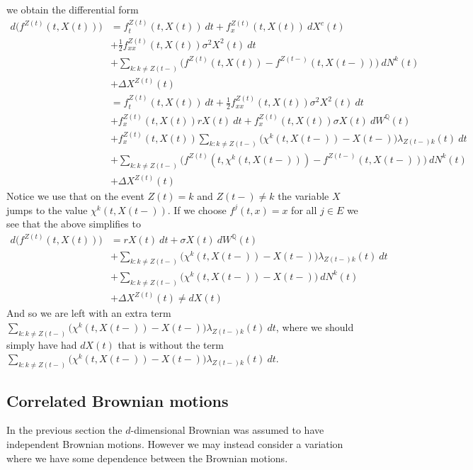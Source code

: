 \documentclass[a4paper,10pt,openany]{book}
\begin{document}
we obtain the differential form
\begin{align*}
d \Big(f^{Z(t)}(t,X(t))\Big)&=f_t^{Z(t)}(t,X(t))\ dt+f_x^{Z(t)}(t,X(t))\ dX^c(t)\\
&+\frac{1}{2}f^{Z(t)}_{xx}(t,X(t))\sigma^2X^2(t)\ dt\\
&+\sum_{k:k\ne Z(t-)}\Big(f^{Z(t)}(t,X(t))-f^{Z(t-)}(t,X(t-))\Big)\ dN^k(t)\\
&+\Delta X^{Z(t)}(t)\\
&=f_t^{Z(t)}(t,X(t))\ dt+\frac{1}{2}f^{Z(t)}_{xx}(t,X(t))\sigma^2X^2(t)\ dt\\
&+f_x^{Z(t)}(t,X(t))rX(t)\ dt+f_x^{Z(t)}(t,X(t))\sigma X(t)\ dW^\mathbb Q(t)\\
&+f_x^{Z(t)}(t,X(t))\sum_{k:k\ne Z(t-)}\Big(\chi^k(t,X(t-))-X(t-)\Big)\lambda_{Z(t-)k}(t)\ dt\\
&+\sum_{k:k\ne Z(t-)}\Big(f^{Z(t)}(t,\chi^k(t,X(t-)))-f^{Z(t-)}(t,X(t-))\Big)\ dN^k(t)\\
&+\Delta X^{Z(t)}(t)
\end{align*}
Notice we use that on the event \(Z(t)=k\) and \(Z(t-)\ne k\) the variable \(X\) jumps to the value \(\chi^k(t,X(t-))\). If we choose \(f^j(t,x)=x\) for all \(j\in E\) we see that the above simplifies to
\begin{align*}
d \Big(f^{Z(t)}(t,X(t))\Big)&=rX(t)\ dt+\sigma X(t)\ dW^\mathbb Q(t)\\
&+\sum_{k:k\ne Z(t-)}\Big(\chi^k(t,X(t-))-X(t-)\Big)\lambda_{Z(t-)k}(t)\ dt\\
&+\sum_{k:k\ne Z(t-)}\Big(\chi^k(t,X(t-))-X(t-))\ dN^k(t)\\
&+\Delta X^{Z(t)}(t)\ne dX(t)
\end{align*}
And so we are left with an extra term \(\sum_{k:k\ne Z(t-)}\Big(\chi^k(t,X(t-))-X(t-)\Big)\lambda_{Z(t-)k}(t)\ dt\), where we should simply have had \(dX(t)\) that is without the term \(\sum_{k:k\ne Z(t-)}\Big(\chi^k(t,X(t-))-X(t-)\Big)\lambda_{Z(t-)k}(t)\ dt\).

\hypertarget{correlated-brownian-motions}{%
\subsection{Correlated Brownian motions}\label{correlated-brownian-motions}}

In the previous section the \(d\)-dimensional Brownian was assumed to have independent Brownian motions. However we may instead consider a variation where we have some dependence between the Brownian motions.
\end{document}
